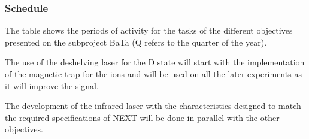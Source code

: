 

\subsubsection*{Schedule}

The table shows the periods of activity for the tasks of the different objectives presented on the subproject BaTa (Q refers to the quarter of the year).

The use of the deshelving laser for the D state will start with the implementation of the magnetic trap for the ions and will be used on all the later experiments as it will improve the signal.

The development of the infrared laser with the characteristics designed to match the required specifications of NEXT will be done in parallel with the other objectives.


